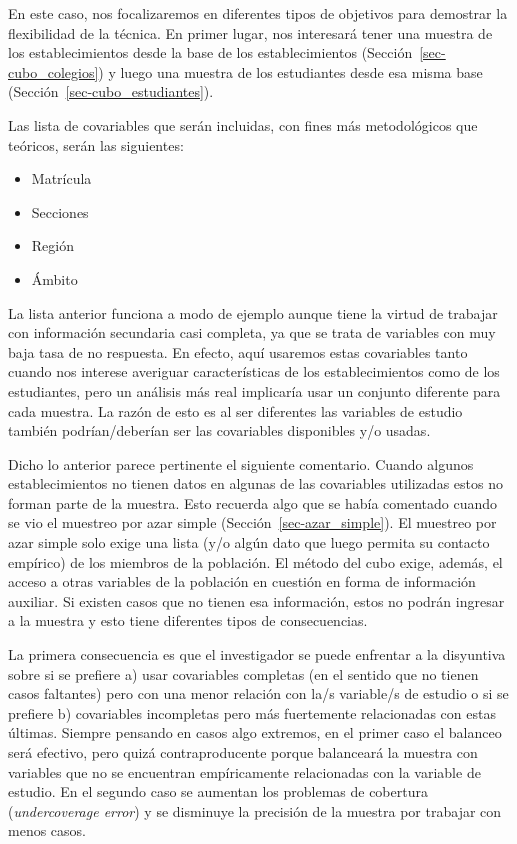 \documentclass[
  spanish,
  a4paper,
]{scrreprt}
\begin{document}
En este caso, nos focalizaremos en diferentes tipos de objetivos para
demostrar la flexibilidad de la técnica. En primer lugar, nos interesará
tener una muestra de los establecimientos desde la base de los
establecimientos (Sección~\ref{sec-cubo_colegios}) y luego una muestra
de los estudiantes desde esa misma base
(Sección~\ref{sec-cubo_estudiantes}).

Las lista de covariables que serán incluidas, con fines más
metodológicos que teóricos, serán las siguientes:

\begin{itemize}
\item
  Matrícula
\item
  Secciones
\item
  Región
\item
  Ámbito
\end{itemize}

\noindent La lista anterior funciona a modo de ejemplo aunque tiene la
virtud de trabajar con información secundaria casi completa, ya que se
trata de variables con muy baja tasa de no respuesta. En efecto, aquí
usaremos estas covariables tanto cuando nos interese averiguar
características de los establecimientos como de los estudiantes, pero un
análisis más real implicaría usar un conjunto diferente para cada
muestra. La razón de esto es al ser diferentes las variables de estudio
también podrían/deberían ser las covariables disponibles y/o usadas.

Dicho lo anterior parece pertinente el siguiente comentario. Cuando
algunos establecimientos no tienen datos en algunas de las covariables
utilizadas estos no forman parte de la muestra. Esto recuerda algo que
se había comentado cuando se vio el muestreo por azar simple
(Sección~\ref{sec-azar_simple}). El muestreo por azar simple solo exige
una lista (y/o algún dato que luego permita su contacto empírico) de los
miembros de la población. El método del cubo exige, además, el acceso a
otras variables de la población en cuestión en forma de información
auxiliar. Si existen casos que no tienen esa información, estos no
podrán ingresar a la muestra y esto tiene diferentes tipos de
consecuencias.

La primera consecuencia es que el investigador se puede enfrentar a la
disyuntiva sobre si se prefiere a) usar covariables completas (en el
sentido que no tienen casos faltantes) pero con una menor relación con
la/s variable/s de estudio o si se prefiere b) covariables incompletas
pero más fuertemente relacionadas con estas últimas. Siempre pensando en
casos algo extremos, en el primer caso el balanceo será efectivo, pero
quizá contraproducente porque balanceará la muestra con variables que no
se encuentran empíricamente relacionadas con la variable de estudio. En
el segundo caso se aumentan los problemas de cobertura
(\emph{undercoverage error}) y se disminuye la precisión de la muestra
por trabajar con menos casos.
\end{document}
